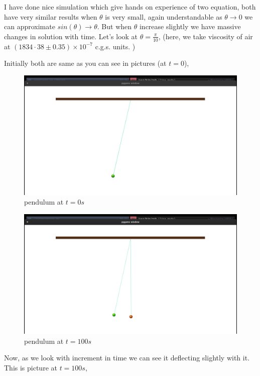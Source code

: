 \documentclass[11pt,a4paper]{article}
\begin{document}
I have done nice simulation which give hands on experience of two equation, both have very similar results when \(\theta\) is very small, again understandable as \(\theta \to 0\) we can approximate \(sin(\theta) \to \theta\). But when \(\theta\) increase slightly we have massive changes in solution with time. Let's look at \(\theta = \frac{\pi}{10}\), (here, we take viscosity of air at \((1834·38\pm0.35)\times10^{−7}\) c.g.s. units. \cite{majumdar1938coefficient})

Initially both are same as you can see in pictures (at \(t=0\)),
\begin{center}
\begin{figure}[htbp]
\centering
\includegraphics[width=0.8 \textwidth]{t0.png}
\caption{\label{fig:orge198a76}pendulum at \(t=0s\)}
\end{figure}
\begin{figure}[htbp]
\centering
\includegraphics[width=0.8 \textwidth]{t100.png}
\caption{\label{fig:org8ff0b09}pendulum at \(t=100s\)}
\end{figure}
\end{center}



Now, as we look with increment in time we can see it deflecting slightly with it. This is picture at \(t = 100s\),
\end{document}
